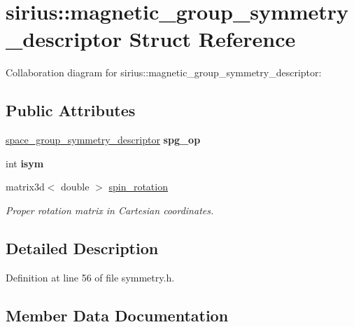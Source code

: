 \hypertarget{structsirius_1_1magnetic__group__symmetry__descriptor}{}\section{sirius\+:\+:magnetic\+\_\+group\+\_\+symmetry\+\_\+descriptor Struct Reference}
\label{structsirius_1_1magnetic__group__symmetry__descriptor}


Collaboration diagram for sirius\+:\+:magnetic\+\_\+group\+\_\+symmetry\+\_\+descriptor\+:
\subsection*{Public Attributes}
\begin{DoxyCompactItemize}
\item 
\hypertarget{structsirius_1_1magnetic__group__symmetry__descriptor_a0bb1d72de0a2356e1be710a21f44826c}{}\hyperlink{structsirius_1_1space__group__symmetry__descriptor}{space\+\_\+group\+\_\+symmetry\+\_\+descriptor} {\bfseries spg\+\_\+op}\label{structsirius_1_1magnetic__group__symmetry__descriptor_a0bb1d72de0a2356e1be710a21f44826c}

\item 
\hypertarget{structsirius_1_1magnetic__group__symmetry__descriptor_a0c9a6f308aa59260d81ae46bdf49646e}{}int {\bfseries isym}\label{structsirius_1_1magnetic__group__symmetry__descriptor_a0c9a6f308aa59260d81ae46bdf49646e}

\item 
matrix3d$<$ double $>$ \hyperlink{structsirius_1_1magnetic__group__symmetry__descriptor_a6c47e5768e389872cae2b25ea05c5ef5}{spin\+\_\+rotation}
\begin{DoxyCompactList}\small\item\em Proper rotation matrix in Cartesian coordinates. \end{DoxyCompactList}\end{DoxyCompactItemize}


\subsection{Detailed Description}


Definition at line 56 of file symmetry.\+h.



\subsection{Member Data Documentation}
\hypertarget{structsirius_1_1magnetic__group__symmetry__descriptor_a6c47e5768e389872cae2b25ea05c5ef5}{}
